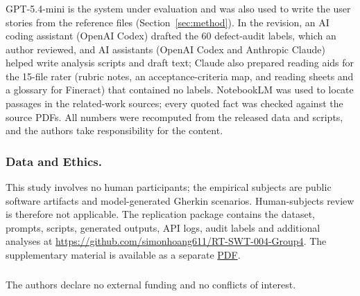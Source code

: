 \begin{credits}
\subsubsection{\ackname}
GPT-5.4-mini is the system under evaluation and was also used to write the user stories from the reference files (Section~\ref{sec:method}). In the revision, an AI coding assistant (OpenAI Codex) drafted the 60 defect-audit labels, which an author reviewed, and AI assistants (OpenAI Codex and Anthropic Claude) helped write analysis scripts and draft text; Claude also prepared reading aids for the 15-file rater (rubric notes, an acceptance-criteria map, and reading sheets and a glossary for Fineract) that contained no labels. NotebookLM was used to locate passages in the related-work sources; every quoted fact was checked against the source PDFs. All numbers were recomputed from the released data and scripts, and the authors take responsibility for the content.

\subsubsection{Data and Ethics.}
This study involves no human participants; the empirical subjects are public software artifacts and model-generated Gherkin scenarios. Human-subjects review is therefore not applicable. The replication package contains the dataset, prompts, scripts, generated outputs, API logs, audit labels and additional analyses at \url{https://github.com/simonhoang611/RT-SWT-004-Group4}. The supplementary material is available as a separate \href{https://github.com/simonhoang611/RT-SWT-004-Group4/blob/main/paper_revised/367005_Evaluating_GPT_5_4_mini_for_Gherkin_Test_Generation_Supplementary_Material.pdf}{PDF}.

\subsubsection{\discintname}
The authors declare no external funding and no conflicts of interest.
\end{credits}
